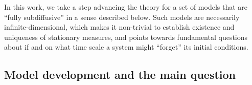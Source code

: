 \documentclass[11pt]{amsart}
\theoremstyle{definition}
\theoremstyle{definition}
\theoremstyle{plain}
\numberwithin{equation}{section}
\begin{document}
In this work, we take a step advancing the theory for a set of models that are ``fully subdiffusive'' in a sense described below.  Such models are necessarily infinite-dimensional, which makes it non-trivial to establish existence and uniqueness of stationary measures, and points towards fundamental questions about if and on what time scale a system might ``forget'' its initial conditions.



\subsection{Model development and the main question}
\end{document}

